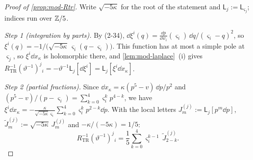 \begin{proof}[Proof of \cref{prop:mod-Rtr}]
Write $\sqrt{-5\kappa}$ for the root of the statement and $\mathsf L_j:=\mathsf L_{\varsigma_j}$; indices run over $\mathbb{Z}/5$.

\emph{Step 1 (integration by parts).} By (2-34), $\dd\xi^i(q)=\frac{\dd p}{\dd w_i}(\varsigma_i)\,\dd q/(\varsigma_i-q)^2$, so $\xi^i(q)=-1/\big(\sqrt{-5\kappa}\,\varsigma_i(q-\varsigma_i)\big)$. This function has at most a simple pole at $\varsigma_j$, so $\xi^i\dd x_\kappa$ is holomorphic there, and \cref{lem:mod-laplace}~(i) gives $R_{\mathrm{TR}}^{-1}(\vartheta^{-1})^j{}_i=-\vartheta^{-1}\mathsf L_j[\dd\xi^i]=\mathsf L_j[\xi^i\dd x_\kappa]$.

\emph{Step 2 (partial fractions).} Since $\dd x_\kappa=\kappa(p^5-v)\,\dd p/p^2$ and $(p^5-v)/(p-\varsigma_i)=\sum_{k=0}^4\varsigma_i^kp^{4-k}$, we have $\xi^i\dd x_\kappa=-\frac{\kappa}{\sqrt{-5\kappa}\varsigma_i}\sum_{k=0}^4\varsigma_i^kp^{2-k}\dd p$. With the local letters $J^{(j)}_m:=\mathsf L_j[p^m\dd p]$, $\tilde J^{(j)}_m:=\sqrt{-5\kappa}\,J^{(j)}_m$ and $-\kappa/(-5\kappa)=1/5$:
\begin{equation}
\label{eq:mod-Rtr-pf}
R_{\mathrm{TR}}^{-1}(\vartheta^{-1})^j{}_i=\frac15\sum_{k=0}^4\varsigma_i^{k-1}\,\tilde J^{(j)}_{2-k}.
\end{equation}


\end{proof}
